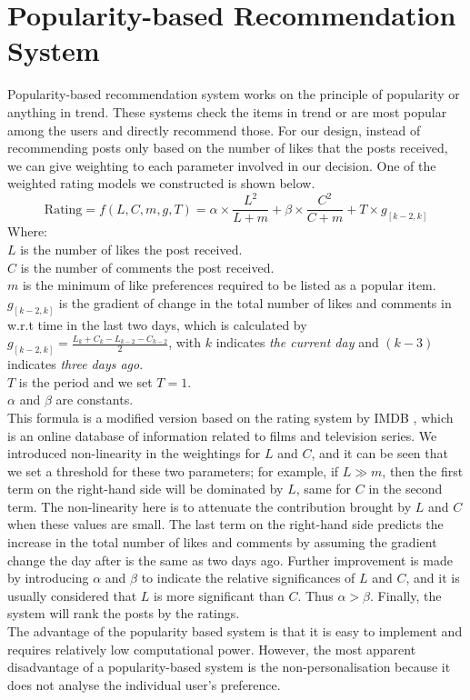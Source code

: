 \section{Popularity-based Recommendation System}
Popularity-based recommendation system works on the principle of popularity or anything in trend. These systems check the items in trend or are most popular among the users and directly recommend those. 
For our design, instead of recommending posts only based on the number of likes that the posts received, we can give weighting to each parameter involved in our decision. One of the weighted rating models we constructed is shown below.
\begin{equation*}
\text{Rating} = f(L,C,m,g,T) = \alpha \times \frac{L^{2}}{L+m} + \beta \times \frac{C^{2}}{C+m} + T \times g_{[k-2,k]}
\end{equation*}
Where:
\\$L$ is the number of likes the post received.
\\$C$ is the number of comments the post received.
\\$m$ is the minimum of like preferences required to be listed as a popular item.
\\$g_{[k-2,k]}$ is the gradient of change in the total number of likes and comments in w.r.t time in the last two days, which is calculated by 
$g_{[k-2,k]} = \frac{L_{k} + C_{k} -L_{k-2} -C_{k-2}}{2}$, with $k$ indicates \textit{the current day} and $(k-3)$ indicates \textit{three days ago}.
\\$T$ is the period and we set $T=1$.
\\ $\alpha$ and $\beta$ are constants.
\\This formula is a modified version based on the rating system by IMDB \footfullcite{}, which is an online database of information related to films and television series. We introduced non-linearity in the weightings for $L$ and $C$, and it can be seen that we set a threshold for these two parameters; for example, if $L \gg m$, then the first term on the right-hand side will be dominated by $L$, same for $C$ in the second term. The non-linearity here is to attenuate the contribution brought by $L$ and $C$ when these values are small. The last term on the right-hand side predicts the increase in the total number of likes and comments by assuming the gradient change the day after is the same as two days ago. Further improvement is made by introducing $\alpha$ and $\beta$ to indicate the relative significances of $L$ and $C$, and it is usually considered that $L$ is more significant than $C$. Thus $\alpha > \beta$. Finally, the system will rank the posts by the ratings.
\\The advantage of the popularity based system is that it is easy to implement and requires relatively low computational power. However, the most apparent disadvantage of a popularity-based system is the non-personalisation because it does not analyse the individual user's preference.


